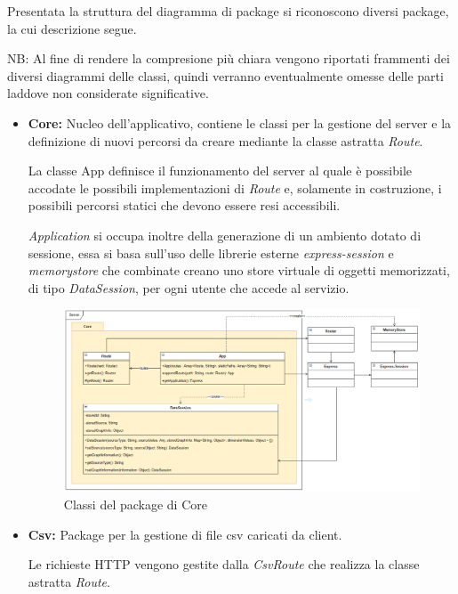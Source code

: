 \documentclass[../manuale_sviluppatore.tex]{subfiles}
\begin{document}
\par Presentata la struttura del diagramma di package si riconoscono diversi package, la cui descrizione segue.

NB: Al fine di rendere la compresione più chiara vengono riportati frammenti dei diversi diagrammi delle classi, 
quindi verranno eventualmente omesse delle parti laddove non considerate significative.
\newpage

\begin{itemize}
	
	\item \textbf{Core:} Nucleo dell'applicativo, contiene le classi per la gestione del server
	e la definizione di nuovi percorsi da creare mediante la classe astratta \emph{Route}. 
	
	La classe App definisce il funzionamento del server al quale è possibile accodate le 
	possibili implementazioni di \emph{Route} e, solamente in costruzione, i possibili 
	percorsi statici che devono essere resi accessibili. 
	
	\emph{Application} si occupa inoltre della generazione di un ambiento dotato di sessione, essa 
	si basa sull'uso delle librerie esterne \emph{express-session} e \emph{memorystore}
	che combinate creano uno store virtuale di oggetti memorizzati, di tipo \emph{DataSession}, per ogni 
	utente che accede al servizio.
		
	\begin{figure}[H]
		\centering
		\includegraphics[width=18cm]{src/img/server-core.png}
		\caption{Classi del package di Core}
	\end{figure}

	\newpage
	\item \textbf{Csv:} Package per la gestione di file csv caricati da client. 
	
	Le richieste HTTP vengono gestite dalla \emph{CsvRoute} che realizza la classe astratta \emph{Route}.
	

\end{itemize}
\end{document}
